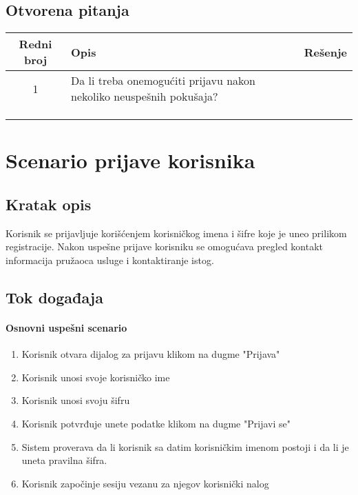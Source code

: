 \documentclass[a4paper,12pt]{report}
\newcommand{\genitivfunkcionalnosti}{prijave korisnika}
\begin{document}
		\subsection{Otvorena pitanja}
			\begin{tabular}{ |c|p{10cm}|l| }
				\hline
				\textbf{Redni broj} & \textbf{Opis} & \textbf{Rešenje} \\ 
				\hline
			    1 & Da li treba onemogućiti prijavu nakon nekoliko neuspešnih pokušaja? &  \\
				\hline
			    &  & \\
				\hline
				&  & \\
				\hline
				&  & \\
				\hline
			\end{tabular}
	\section{Scenario \genitivfunkcionalnosti}
		\subsection{Kratak opis}
			Korisnik se prijavljuje korišćenjem korisničkog imena i šifre koje je uneo prilikom
			registracije. Nakon uspešne prijave korisniku se omogućava pregled kontakt informacija pružaoca usluge i
			kontaktiranje istog.
		\newpage
		\subsection{Tok događaja}
			\paragraph*{Osnovni uspešni scenario}
				\begin{enumerate}
					\item Korisnik otvara dijalog za prijavu klikom na dugme "Prijava"
					\item Korisnik unosi svoje korisničko ime
					\item Korisnik unosi svoju šifru
					\item Korisnik potvrđuje unete podatke klikom na dugme "Prijavi se"
					\item Sistem proverava da li korisnik sa datim korisničkim imenom postoji i da li je uneta pravilna šifra.
					\item Korisnik započinje sesiju vezanu za njegov korisnički nalog
				\end{enumerate}
\end{document}
